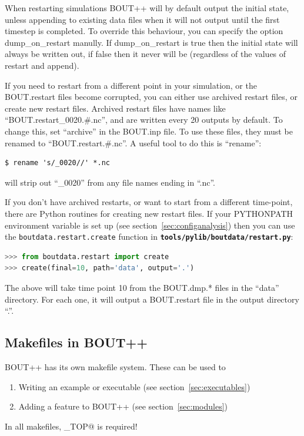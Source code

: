 \documentclass[12pt]{article}
\newcommand{\file}[1]{\texttt{\bf #1}}
\begin{document}
When restarting simulations BOUT++ will by default output the initial state,
unless appending to existing data files when it will not output until the first
timestep is completed. To override this behaviour, you can specify the option
dump\_on\_restart manully. If dump\_on\_restart is true then the initial state
will always be written out, if false then it never will be (regardless of the
values of restart and append).

If you need to restart from a different point in your simulation, or the
BOUT.restart files become corrupted, you can either use archived restart files,
or create new restart files.  Archived restart files have names like
``BOUT.restart\_0020.\#.nc'', and are written every 20 outputs by default. To
change this, set ``archive'' in the BOUT.inp file.  To use these files, they
must be renamed to ``BOUT.restart.\#.nc''. A useful tool to do this is
``rename'':
%
\begin{verbatim}
$ rename 's/_0020//' *.nc
\end{verbatim}
%
will strip out ``\_0020'' from any file names ending in ``.nc''.

If you don't have archived restarts, or want to start from a different
time-point, there are Python routines for creating new restart files. If your
PYTHONPATH environment variable is set up (see
section~\ref{sec:configanalysis}) then you can use the
%
\lstinline!boutdata.restart.create!
%
 function in \file{tools/pylib/boutdata/restart.py}:

%
\begin{lstlisting}[language=python,numbers=none]
>>> from boutdata.restart import create
>>> create(final=10, path='data', output='.')
\end{lstlisting}
%
The above will take time point 10 from the BOUT.dmp.* files in the ``data''
directory.  For each one, it will output a BOUT.restart file in the output
directory ``.''.



\subsection{Makefiles in BOUT++}
%
BOUT++ has its own makefile system. These can be used to
%
\begin{enumerate}
 \item Writing an example or executable (see section~\ref{sec:executables})
 \item Adding a feature to BOUT++ (see section~\ref{sec:modules})
\end{enumerate}
%
In all makefiles, \verb@BOUT_TOP@ is required!
\end{document}
